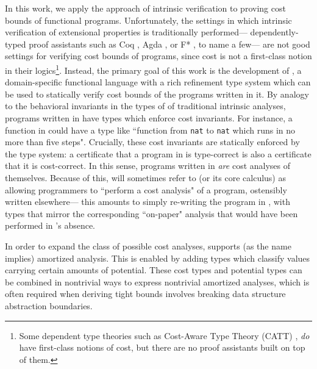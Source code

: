 In this work, we apply the approach of intrinsic verification to proving cost bounds of functional programs. Unfortunately, the settings in which intrinsic verification of extensional properties is traditionally performed--- dependently-typed proof assistants such as Coq \citehere, Agda \citehere, or F* \citehere, to name a few--- are not good settings for verifying cost bounds of programs, since cost is not a first-class notion in their logics\footnote{
Some dependent type theories such as Cost-Aware Type Theory (CATT) \citehere, \textit{do} have first-class notions of cost, but there are no proof assistants built on top of them.
}. Instead, the primary goal of this work is the development of \lambdaamorimpl, a domain-specific functional language with a rich refinement type system which can be used to statically verify cost bounds of the programs written in it. By analogy to the behavioral invariants in the types of of traditional intrinsic analyses, programs written in \lambdaamor have types which enforce cost invariants. For instance, a function in \lambdaamorimpl could have a type like ``function from \texttt{nat} to \texttt{nat} which runs in no more than five steps". Crucially, these cost invariants are statically enforced by the type system: a certificate that a program in \lambdaamorimpl is type-correct is also a certificate that it is cost-correct. In this sense, programs written in \lambdaamorimpl \textit{are} cost analyses of themselves. Because of this, will sometimes refer to \lambdaamorimpl (or its core calculus) as allowing programmers to ``perform a cost analysis" of a program, ostensibly written elsewhere--- this amounts to simply re-writing the program in \lambdaamorimpl, with types that mirror the corresponding ``on-paper" analysis that would have been performed in \lambdaamorimpl's absence.

In order to expand the class of possible cost analyses, \lambdaamorimpl supports (as the name implies) amortized analysis. This is enabled by adding types which classify values carrying certain amounts of potential. These cost types and potential types can be combined in nontrivial ways to express nontrivial amortized analyses, which is often required when deriving tight bounds involves breaking data structure abstraction boundaries.


